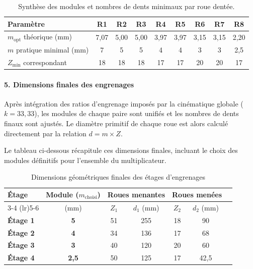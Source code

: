 \documentclass[11pt,a4paper]{article}
\begin{document}
\begin{table}[htbp]
\centering
\small
\caption{Synthèse des modules et nombres de dents minimaux par roue dentée.}
\label{tab:synthese_engrenages_opt}
\begin{tabular}{lcccccccc}
    \toprule
    \textbf{Paramètre} & \textbf{R1} & \textbf{R2} & \textbf{R3} & \textbf{R4} & \textbf{R5} & \textbf{R6} & \textbf{R7} & \textbf{R8} \\
    \midrule
    $m_{\text{opt}}$ théorique (\unit{\milli\meter}) & 7{,}07 & 5{,}00 & 5{,}00 & 3{,}97 & 3{,}97 & 3{,}15 & 3{,}15 & 2{,}20 \\
    $m$ pratique minimal (\unit{\milli\meter}) & 7 & 5 & 5 & 4 & 4 & 3 & 3 & 2{,}5 \\
    $Z_{\min}$ correspondant & 18 & 18 & 18 & 17 & 17 & 20 & 20 & 17 \\
    \bottomrule
\end{tabular}
\end{table}

\paragraph{5. Dimensions finales des engrenages}
Après intégration des ratios d'engrenage imposés par la cinématique globale ($k = 33{,}33$), les modules de chaque paire sont unifiés et les nombres de dents finaux sont ajustés. Le diamètre primitif de chaque roue est alors calculé directement par la relation $d = m \times Z$.

Le tableau ci-dessous récapitule ces dimensions finales, incluant le choix des modules définitifs pour l'ensemble du multiplicateur.

\begin{table}[H]
    \centering
    \caption{Dimensions géométriques finales des étages d'engrenages}
    \label{tab:dimensions_finales_engrenages}
    \small
    \begin{tabular}{lcccccc}
        \toprule
        \textbf{Étage} & \textbf{Module ($m_{\text{choisi}}$)} & \multicolumn{2}{c}{\textbf{Roues menantes}} & \multicolumn{2}{c}{\textbf{Roues menées}} \\
        \cmidrule(lr){3-4} \cmidrule(lr){5-6}
        & (\unit{\milli\meter}) & $Z_1$ & $d_1$ (\unit{\milli\meter}) & $Z_2$ & $d_2$ (\unit{\milli\meter}) \\
        \midrule
        \textbf{Étage 1} & \textbf{5}   & 51 & 255 & 18 & 90 \\
        \textbf{Étage 2} & \textbf{4}   & 34 & 136 & 17 & 68 \\
        \textbf{Étage 3} & \textbf{3}   & 40 & 120 & 20 & 60 \\
        \textbf{Étage 4} & \textbf{2{,}5} & 50 & 125 & 17 & 42{,}5 \\
        \bottomrule
    \end{tabular}
\end{table}
\end{document}
